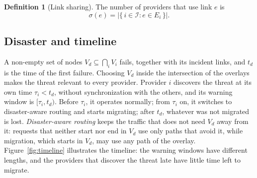 \documentclass[11pt,a4paper]{article}
\theoremstyle{definition}
\newtheorem{definition}{Definition}
\begin{document}
\begin{definition}[Link sharing]
The number of providers that use link $e$ is
\begin{equation}
  \sigma(e) = \bigl|\{\,i\in\mathcal{I} : e\in E_i\,\}\bigr| .
\end{equation}
\end{definition}

\subsection{Disaster and timeline}
\label{sec:timeline}

A non-empty set of nodes $V_d\subseteq\bigcap_{i}V_i$ fails, together with its incident links, and $t_d$ is the time of the first failure.
Choosing $V_d$ inside the intersection of the overlays makes the threat relevant to every provider.
Provider $i$ discovers the threat at its own time $\tau_i<t_d$, without synchronization with the others, and its warning window is $[\tau_i,t_d)$.
Before $\tau_i$, it operates normally; from $\tau_i$ on, it switches to disaster-aware routing and starts migrating; after $t_d$, whatever was not migrated is lost.
\emph{Disaster-aware routing} keeps the traffic that does not need $V_d$ away from it: requests that neither start nor end in $V_d$ use only paths that avoid it, while migration, which starts in $V_d$, may use any path of the overlay.
Figure~\ref{fig:timeline} illustrates the timeline: the warning windows have different lengths, and the providers that discover the threat late have little time left to migrate.
\end{document}
